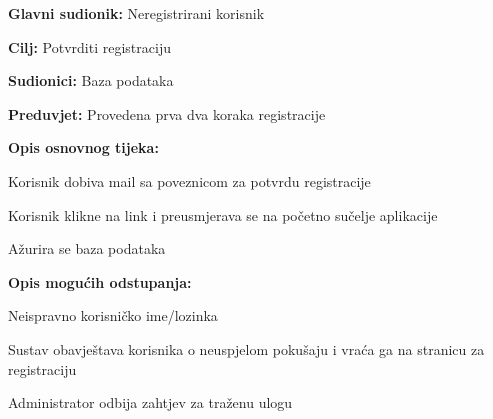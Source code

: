 					

					\noindent {}
					\begin{packed_item}
	
						\item \textbf{Glavni sudionik: }Neregistrirani korisnik
						\item  \textbf{Cilj:} Potvrditi registraciju
						\item  \textbf{Sudionici:} Baza podataka
						\item  \textbf{Preduvjet:} Provedena prva dva koraka registracije
						\item  \textbf{Opis osnovnog tijeka:} 
						
						
						\item[] \begin{packed_enum}
	
							\item Korisnik dobiva mail sa poveznicom za potvrdu registracije						
							\item Korisnik klikne na link i preusmjerava se na početno sučelje aplikacije
							\item Ažurira se baza podataka
							
						\end{packed_enum}
						
						\item  \textbf{Opis mogućih odstupanja:}
						
						\item[] \begin{packed_item}
	
							\item[2.a] Neispravno korisničko ime/lozinka
							\item[] \begin{packed_enum}
								
								\item Sustav obavještava korisnika o neuspjelom pokušaju i vraća ga na stranicu za registraciju 
								
							\end{packed_enum}
							\item[3.a] Administrator odbija zahtjev za traženu ulogu
							\item[] \begin{packed_enum}
								

\end{packed_enum}
\end{packed_item}
\end{packed_item}
